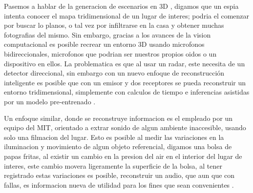 \documentclass[a4paper]{IEEEtranUNT}
\begin{document}
Pasemos a hablar de la generacion de escenarios en 3D , digamos que un espia intenta conocer el mapa tridimensional de un lugar de interes; podria el comenzar por buscar lo planos, o tal vez por infiltrarse en la casa y obtener muchas fotografias del mismo. Sin embargo, gracias a los avances de la vision computacional es posible recrear un entorno 3D usando microfonos bidireccionales, microfonos que podrian ser nuestros propios oidos o un dispositivo en ellos. La problematica es que al usar un radar, este necesita de un detector direccional, sin embargo con un nuevo enfoque de reconstrucción inteligente es posible que con un emisor y dos receptores se pueda reconstruir un entorno tridimensional, simplemente con calculos de tiempo e inferencias asistidas por un modelo pre-entrenado \citep{christensen2019batvision}.

Un enfoque similar, donde se reconstruye informacion es el empleado por un equipo del MIT, orientado a extrar sonido de algun ambiente inaccesible, usando solo una filmacion del lugar. Esto es posible al medir las variaciones en la iluminacion y movimiento de algun objeto referencial, digamos una bolsa de papas fritas, al existir un cambio en la presion del air en el interior del lugar de interes, este cambio movera ligeramente la superficie de la bolsa, al tener registrado estas variaciones es posible,  reconstruir un audio, que aun que con fallas, es informacion nueva de utilidad para los fines que sean convenientes \citep{Davis2014VisualMic}.






\end{document}
